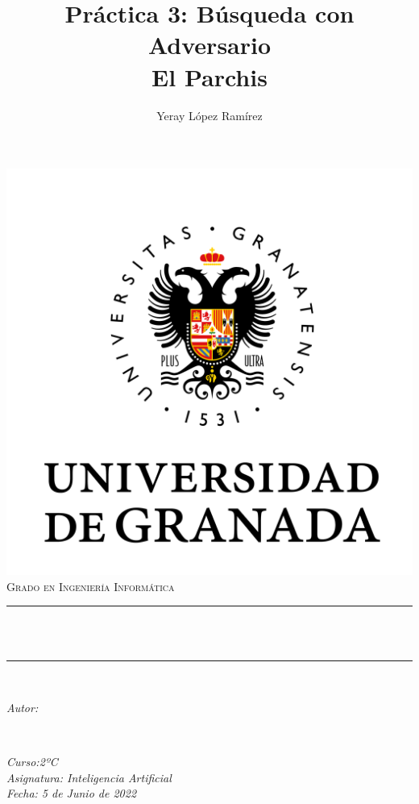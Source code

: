 \documentclass[12pt, spanish]{article}
\title{Práctica 3: Búsqueda con Adversario \\
El Parchis \hspace{0.05cm} }
\date{}
\author{
Yeray López Ramírez \\
}
\makeatletter
\let\thetitle\@title
\let\theauthor\@author
\makeatother
\begin{document}
\begin{titlepage}
  \centering
  \vspace*{0.5 cm}
  \includegraphics[scale = 0.50]{ugr.png}\\[1.0 cm]
  \textsc{\huge Grado en Ingeniería Informática}\\[0.5 cm]
  \rule{\linewidth}{0.2 mm} \\[0.4 cm]
  { \huge \bfseries \thetitle}\\
  \rule{\linewidth}{0.2 mm} \\[1.5 cm]
  
  \begin{minipage}{0.4\textwidth}
    \begin{flushleft} \large
        \emph{Autor:}\\

        \theauthor
        \end{flushleft}
        \end{minipage}~
        \begin{minipage}{0.4\textwidth}
        \begin{flushright} \large
        \emph{Curso:2ºC \\
        Asignatura: Inteligencia Artificial \\
        Fecha: 5 de Junio de 2022
        }
    \end{flushright}
\end{minipage}\\[1 cm]


\vfill
  
\end{titlepage}
\end{document}
